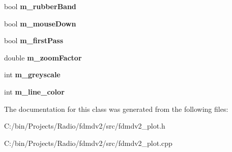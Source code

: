\begin{DoxyCompactItemize}
\item 
\hypertarget{class_plot_panel_a7182715e509f98f42e78210d324fe042}{bool {\bfseries m\-\_\-rubber\-Band}}\label{class_plot_panel_a7182715e509f98f42e78210d324fe042}

\item 
\hypertarget{class_plot_panel_acebe9485868374626f03516e3508b592}{bool {\bfseries m\-\_\-mouse\-Down}}\label{class_plot_panel_acebe9485868374626f03516e3508b592}

\item 
\hypertarget{class_plot_panel_a1bb0714da68ee75a51a4ebb9e9ea3cad}{bool {\bfseries m\-\_\-first\-Pass}}\label{class_plot_panel_a1bb0714da68ee75a51a4ebb9e9ea3cad}

\item 
\hypertarget{class_plot_panel_ae2f4907a8e4ed958ef4995e99b1f7148}{double {\bfseries m\-\_\-zoom\-Factor}}\label{class_plot_panel_ae2f4907a8e4ed958ef4995e99b1f7148}

\item 
\hypertarget{class_plot_panel_ab5bc0c62a2dcfccb9e0d9663d7983e3f}{int {\bfseries m\-\_\-greyscale}}\label{class_plot_panel_ab5bc0c62a2dcfccb9e0d9663d7983e3f}

\item 
\hypertarget{class_plot_panel_aff281e896bdb1f76d9ccbbe1d15c721d}{int {\bfseries m\-\_\-line\-\_\-color}}\label{class_plot_panel_aff281e896bdb1f76d9ccbbe1d15c721d}

\end{DoxyCompactItemize}


The documentation for this class was generated from the following files\-:\begin{DoxyCompactItemize}
\item 
C\-:/bin/\-Projects/\-Radio/fdmdv2/src/fdmdv2\-\_\-plot.\-h\item 
C\-:/bin/\-Projects/\-Radio/fdmdv2/src/fdmdv2\-\_\-plot.\-cpp\end{DoxyCompactItemize}
